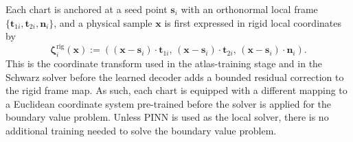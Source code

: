 \documentclass[sort&compress]{svjour3} %
\newcommand{\tensor}[1]{\ensuremath{\boldsymbol{#1}}}
\begin{document}
Each chart is anchored at a seed point $\tensor s_i$ with an orthonormal local frame $\{\mathbf{t}_{1i},\mathbf{t}_{2i},\mathbf{n}_i\}$, and a physical sample $\tensor x$ is first expressed in rigid local coordinates by
\begin{equation}
\boldsymbol{\zeta}^{\mathrm{rig}}_i(\tensor x)
:=
\left(
(\tensor x-\tensor s_i)\cdot \mathbf{t}_{1i},
\,
(\tensor x-\tensor s_i)\cdot \mathbf{t}_{2i},
\,
(\tensor x-\tensor s_i)\cdot \mathbf{n}_i
\right).
\label{eq:atlas_rigid_local_coords}
\end{equation}
This is the coordinate transform used in the atlas-training stage and in the Schwarz solver before the learned decoder adds a bounded residual correction to the rigid frame map. As such, each chart is equipped with a different mapping to a Euclidean coordinate system pre-trained before the solver is applied for the boundary value problem. Unless PINN is used as the local solver, there is no additional training needed to solve the boundary value problem. 
\end{document}
